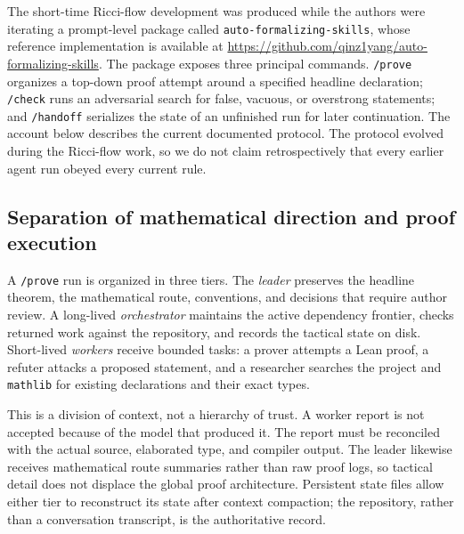 \documentclass[11pt]{article}
\theoremstyle{plain}
\theoremstyle{definition}
\theoremstyle{remark}
\begin{document}
The short-time Ricci-flow development was produced while the authors were
iterating a prompt-level package called \texttt{auto-formalizing-skills}, whose
reference implementation is available at
\url{https://github.com/qinz1yang/auto-formalizing-skills}.  The package exposes
three principal commands.  \texttt{/prove} organizes a top-down proof attempt
around a specified headline declaration; \texttt{/check} runs an adversarial
search for false, vacuous, or overstrong statements; and \texttt{/handoff}
serializes the state of an unfinished run for later continuation.  The account
below describes the current documented protocol.  The protocol evolved during
the Ricci-flow work, so we do not claim retrospectively that every earlier
agent run obeyed every current rule.

\subsection{Separation of mathematical direction and proof execution}

A \texttt{/prove} run is organized in three tiers.  The \emph{leader} preserves
the headline theorem, the mathematical route, conventions, and decisions that
require author review.  A long-lived \emph{orchestrator} maintains the active
dependency frontier, checks returned work against the repository, and records
the tactical state on disk.  Short-lived \emph{workers} receive bounded tasks:
a prover attempts a Lean proof, a refuter attacks a proposed statement, and a
researcher searches the project and \texttt{mathlib} for existing declarations
and their exact types.

This is a division of context, not a hierarchy of trust.  A worker report is
not accepted because of the model that produced it.  The report must be
reconciled with the actual source, elaborated type, and compiler output.  The
leader likewise receives mathematical route summaries rather than raw proof
logs, so tactical detail does not displace the global proof architecture.
Persistent state files allow either tier to reconstruct its state after
context compaction; the repository, rather than a conversation transcript, is
the authoritative record.
\end{document}
